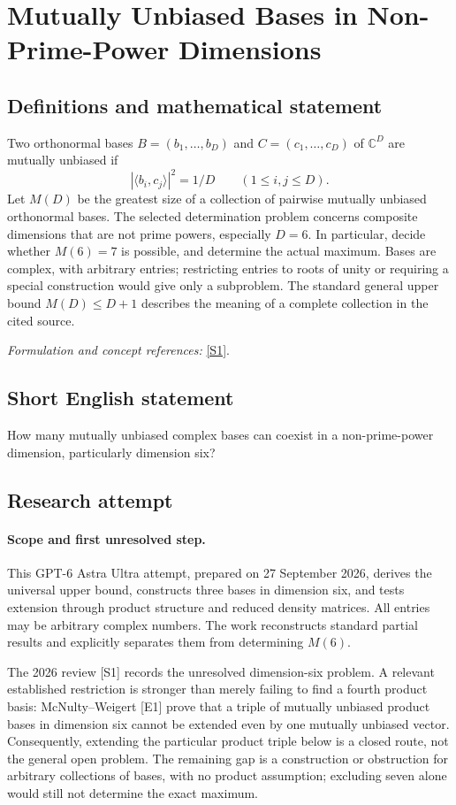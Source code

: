 \documentclass[11pt]{article}
\begin{document}
\section*{\texorpdfstring{Mutually Unbiased Bases in Non-Prime-Power Dimensions}{Mutually Unbiased Bases in Non-Prime-Power Dimensions}}\label{statement}
\subsection{Definitions and mathematical statement}
Two orthonormal bases $B=(b_1,\ldots,b_D)$ and $C=(c_1,\ldots,c_D)$ of ${\mathbb{C}}^D$ are mutually unbiased if
\[
 |\langle b_i,c_j\rangle|^2=1/D\qquad(1\le i,j\le D).
\]
Let $M(D)$ be the greatest size of a collection of pairwise mutually unbiased orthonormal bases. The selected determination problem concerns composite dimensions that are not prime powers, especially $D=6$. In particular, decide whether $M(6)=7$ is possible, and determine the actual maximum. Bases are complex, with arbitrary entries; restricting entries to roots of unity or requiring a special construction would give only a subproblem. The standard general upper bound $M(D)\le D+1$ describes the meaning of a complete collection in the cited source.
\par\smallskip\textit{Formulation and concept references:} \href{https://quantum-journal.org/papers/q-2026-04-01-2051/}{[S1]}.

\subsection{Short English statement}
How many mutually unbiased complex bases can coexist in a non-prime-power dimension, particularly dimension six?
\subsection{Research attempt}
\paragraph{Scope and first unresolved step.}
This GPT-6 Astra Ultra attempt, prepared on 27 September 2026, derives the universal upper bound, constructs three bases in dimension six, and tests extension through product structure and reduced density matrices. All entries may be arbitrary complex numbers. The work reconstructs standard partial results and explicitly separates them from determining $M(6)$.

The 2026 review [S1] records the unresolved dimension-six problem. A relevant established restriction is stronger than merely failing to find a fourth product basis: McNulty--Weigert [E1] prove that a triple of mutually unbiased product bases in dimension six cannot be extended even by one mutually unbiased vector. Consequently, extending the particular product triple below is a closed route, not the general open problem. The remaining gap is a construction or obstruction for arbitrary collections of bases, with no product assumption; excluding seven alone would still not determine the exact maximum.
\end{document}
